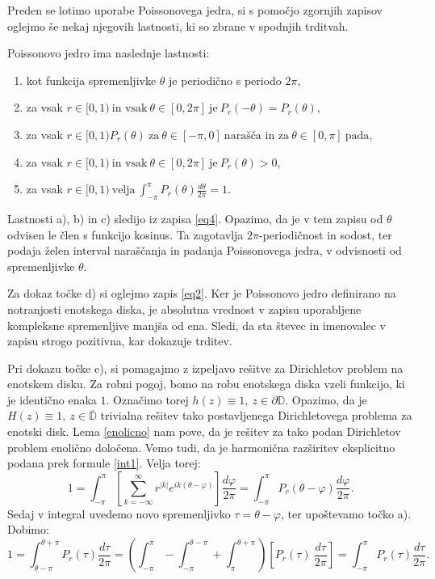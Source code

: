 \documentclass[mat1]{fmfdelo}
\begin{document}
    Preden se lotimo uporabe Poissonovega jedra, si s pomočjo zgornjih zapisov oglejmo še nekaj njegovih lastnosti, ki so zbrane v spodnjih trditvah. 
    
    \begin{trditev}
        \label{lastpk}
        Poissonovo jedro ima naslednje lastnosti:
        \begin{enumerate}[label={\alph*)}]
            \item kot funkcija spremenljivke $\theta$ je periodično s periodo $2\pi$, 
            \item za vsak $r \in [0,1)~\text{in vsak}~\theta \in [0,2\pi]~\text{je}~P_r(-\theta) = P_r(\theta)$,
            \item za vsak $r \in [0,1) P_r(\theta)~\text{za}~\theta \in [-\pi, 0 ]~\text{narašča in za}~\theta \in [0, \pi ]~\text{pada}$,
            \item za vsak $r \in [0,1)~\text{in vsak}~\theta\in [0,2\pi]~\text{je}~P_r(\theta) > 0$,
            \item za vsak $r \in [0,1)~\text{velja}~\int_{-\pi}^{\pi}{P_r(\theta) \frac{d\theta}{2\pi}} = 1$.
        \end{enumerate}
    \end{trditev}
    \begin{dokaz}
        Lastnosti a), b) in c) sledijo iz zapisa \eqref{eq4}. Opazimo, da je v tem zapisu od $\theta$ odvisen le člen s funkcijo kosinus. 
        Ta zagotavlja $2\pi$-periodičnost in sodost, ter podaja želen interval naraščanja in padanja Poissonovega jedra, v odvisnosti od spremenljivke $\theta$. 
        
        Za dokaz točke d) si oglejmo zapis \eqref{eq2}. Ker je Poissonovo jedro definirano na notranjosti enotskega diska, je absolutna vrednost v zapisu uporabljene kompleksne spremenljive manjša od ena. 
        Sledi, da sta števec in imenovalec v zapisu strogo pozitivna, kar dokazuje trditev. 

        Pri dokazu točke e), si pomagajmo z izpeljavo rešitve za Dirichletov problem na enotskem disku. 
        Za robni pogoj, bomo na robu enotskega diska vzeli funkcijo, ki je identično enaka $1$. Označimo torej $h(z) \equiv 1,~ z \in \partial \mathbb{D}$. Opazimo, da je \mbox{$H(z) \equiv 1,~z \in \overline{\mathbb{D}}$} trivialna rešitev tako postavljenega Dirichletovega problema za enotski disk.
        Lema \ref{enolicno} nam pove, da je rešitev za tako podan Dirichletov problem enolično določena. Vemo tudi, da je harmonična razširitev eksplicitno podana prek formule \eqref{int1}.
        Velja torej:
        $$
        1 = \int_{-\pi}^{\pi}{\left[\sum_{k=-\infty}^{\infty}{r^{|k|} e^{ik(\theta - \varphi)}}\right] \frac{d \varphi}{2 \pi}} = \int_{-\pi}^{\pi}{P_r(\theta - \varphi)\frac{d \varphi}{2 \pi}}. 
        $$
        Sedaj v integral uvedemo novo spremenljivko $\tau = \theta - \varphi$, ter upoštevamo točko a). Dobimo: 
        $$
        1 = \int_{\theta - \pi}^{\theta + \pi}{P_r(\tau)\frac{d \tau}{2 \pi}} = \left(\int_{-\pi}^{\pi} - \int_{-\pi}^{\theta -\pi} + \int_{\pi}^{\theta + \pi}\right)\left[ P_r(\tau)~\frac{d\tau}{2 \pi}\right] = \int_{-\pi}^{\pi}{P_r(\tau)\frac{d \tau}{2 \pi}}.
        $$
    \end{dokaz}
\end{document}
